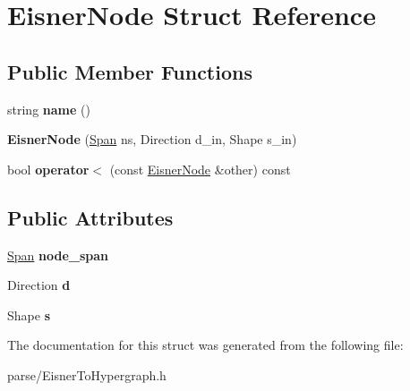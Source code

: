 \hypertarget{struct_eisner_node}{
\section{EisnerNode Struct Reference}
\label{struct_eisner_node}
}
\subsection*{Public Member Functions}
\begin{DoxyCompactItemize}
\item 
\hypertarget{struct_eisner_node_a38fe91d99e35e7d8a6bda3c1bb45f3d6}{
string {\bfseries name} ()}
\label{struct_eisner_node_a38fe91d99e35e7d8a6bda3c1bb45f3d6}

\item 
\hypertarget{struct_eisner_node_a16b4c3b130c5cacf4639fb8fc01d1894}{
{\bfseries EisnerNode} (\hyperlink{struct_span}{Span} ns, Direction d\_\-in, Shape s\_\-in)}
\label{struct_eisner_node_a16b4c3b130c5cacf4639fb8fc01d1894}

\item 
\hypertarget{struct_eisner_node_a8ede91dac02b136ef673afbb68566623}{
bool {\bfseries operator$<$} (const \hyperlink{struct_eisner_node}{EisnerNode} \&other) const }
\label{struct_eisner_node_a8ede91dac02b136ef673afbb68566623}

\end{DoxyCompactItemize}
\subsection*{Public Attributes}
\begin{DoxyCompactItemize}
\item 
\hypertarget{struct_eisner_node_a1e3b0f200089af99ca744d6d0a9c7f72}{
\hyperlink{struct_span}{Span} {\bfseries node\_\-span}}
\label{struct_eisner_node_a1e3b0f200089af99ca744d6d0a9c7f72}

\item 
\hypertarget{struct_eisner_node_a0013abe4607fb7979aa1d915a58868a1}{
Direction {\bfseries d}}
\label{struct_eisner_node_a0013abe4607fb7979aa1d915a58868a1}

\item 
\hypertarget{struct_eisner_node_a682edd0712304525c84939b820a141d3}{
Shape {\bfseries s}}
\label{struct_eisner_node_a682edd0712304525c84939b820a141d3}

\end{DoxyCompactItemize}


The documentation for this struct was generated from the following file:\begin{DoxyCompactItemize}
\item 
parse/EisnerToHypergraph.h\end{DoxyCompactItemize}
